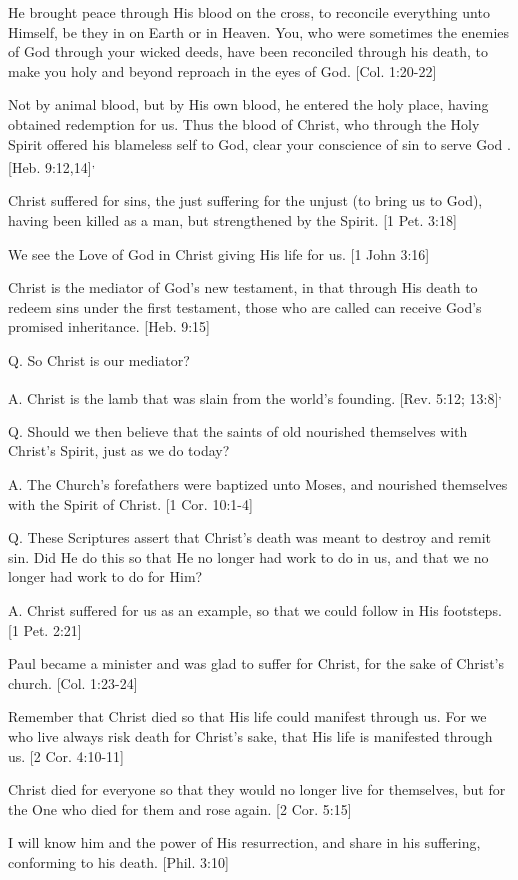 \documentclass[../main.tex]{subfiles}
\begin{document}
He brought peace through His blood on the cross, to reconcile everything unto Himself, be they in on Earth or in Heaven. You, who were sometimes the enemies of God through your wicked deeds, have been reconciled through his death, to make you holy and beyond reproach in the eyes of God. [Col. 1:20-22]

Not by animal blood, but by His own blood, he entered the holy place, having obtained redemption for us. Thus the blood of Christ, who through the Holy Spirit offered his blameless self to God, clear your conscience of sin to serve God .[Heb. 9:12,14]\textsuperscript{,}

Christ suffered for sins, the just suffering for the unjust (to bring us to God), having been killed as a man, but strengthened by the Spirit. [1 Pet. 3:18]

We see the Love of God in Christ giving His life for us. [1 John 3:16]

Christ is the mediator of God's new testament, in that through His death to redeem sins under the first testament, those who are called can receive God's promised inheritance. [Heb. 9:15]

Q. So Christ is our mediator?

A. Christ is the lamb that was slain from the world's founding. [Rev. 5:12; 13:8]\textsuperscript{,}

Q. Should we then believe that the saints of old nourished themselves with Christ's Spirit, just as we do today?

A. The Church's forefathers were baptized unto Moses, and nourished themselves with the Spirit of Christ. [1 Cor. 10:1-4]

Q. These Scriptures assert that Christ's death was meant to destroy and remit sin. Did He do this so that He no longer had work to do in us, and that we no longer had work to do for Him?

A. Christ suffered for us as an example, so that we could follow in His footsteps. [1 Pet. 2:21]

Paul became a minister and was glad to suffer for Christ, for the sake of Christ's church. [Col. 1:23-24]

Remember that Christ died so that His life could manifest through us. For we who live always risk death for Christ's sake, that His life is manifested through us. [2 Cor. 4:10-11]

Christ died for everyone so that they would no longer live for themselves, but for the One who died for them and rose again. [2 Cor. 5:15]

I will know him and the power of His resurrection, and share in his suffering, conforming to his death. [Phil. 3:10]



	
	
	
	
	
	
	
	
	
\end{document}
